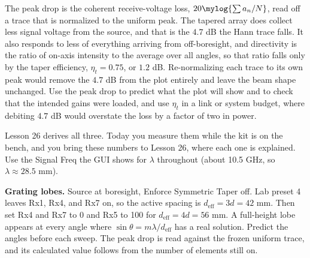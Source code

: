 \documentclass{exam}
\begin{document}
\begin{questions}
\begin{parts}
	\begin{solutionorlines}[2.6in]
	The peak drop is the coherent receive-voltage loss,
	$20\mylog{\sum a_n / N}$, read off a trace that is normalized to the uniform
	peak. The tapered array does collect less signal voltage from the source, and
	that is the $4.7$ dB the Hann trace falls. It also responds to less of
	everything arriving from off-boresight, and directivity is the ratio of
	on-axis intensity to the average over all angles, so that ratio falls only by
	the taper efficiency, $\eta_t = 0.75$, or $1.2$ dB. Re-normalizing each trace
	to its own peak would remove the $4.7$ dB from the plot entirely and leave the
	beam shape unchanged. Use the peak drop to predict what the plot will show and
	to check that the intended gains were loaded, and use $\eta_t$ in a link or
	system budget, where debiting $4.7$ dB would overstate the loss by a factor of
	two in power.
	\end{solutionorlines}

\end{parts}

\newpage
{}

Lesson 26 derives all three. Today you measure them while the kit is on the
bench, and you bring these numbers to Lesson 26, where each one is explained.
Use the Signal Freq the GUI shows for $\lambda$ throughout (about 10.5 GHz,
so $\lambda \approx 28.5$ mm).

\question \textbf{Grating lobes.} Source at boresight, Enforce Symmetric Taper
off. Lab preset 4 leaves Rx1, Rx4, and Rx7 on, so the active spacing is
$d_\text{eff} = 3d = 42$ mm. Then set Rx4 and Rx7 to 0 and Rx5 to 100 for
$d_\text{eff} = 4d = 56$ mm. A full-height lobe appears at every angle where
$\sin\theta = m\lambda/d_\text{eff}$ has a real solution. Predict the angles
before each sweep. The peak drop is read against the frozen uniform trace, and
its calculated value follows from the number of elements still on.


\end{questions}
\end{document}
